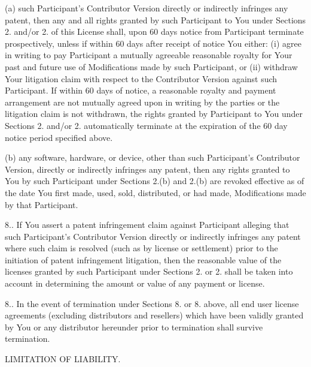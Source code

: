 \begin{DoxyEnumerate}
(a) such Participant's Contributor Version directly or indirectly infringes any patent, then any and all rights granted by such Participant to You under Sections 2. and/or 2. of this License shall, upon 60 days notice from Participant terminate prospectively, unless if within 60 days after receipt of notice You either\-: (i) agree in writing to pay Participant a mutually agreeable reasonable royalty for Your past and future use of Modifications made by such Participant, or (ii) withdraw Your litigation claim with respect to the Contributor Version against such Participant. If within 60 days of notice, a reasonable royalty and payment arrangement are not mutually agreed upon in writing by the parties or the litigation claim is not withdrawn, the rights granted by Participant to You under Sections 2. and/or 2. automatically terminate at the expiration of the 60 day notice period specified above.

(b) any software, hardware, or device, other than such Participant's Contributor Version, directly or indirectly infringes any patent, then any rights granted to You by such Participant under Sections 2.(b) and 2.(b) are revoked effective as of the date You first made, used, sold, distributed, or had made, Modifications made by that Participant.

8.. If You assert a patent infringement claim against Participant alleging that such Participant's Contributor Version directly or indirectly infringes any patent where such claim is resolved (such as by license or settlement) prior to the initiation of patent infringement litigation, then the reasonable value of the licenses granted by such Participant under Sections 2. or 2. shall be taken into account in determining the amount or value of any payment or license.

8.. In the event of termination under Sections 8. or 8. above, all end user license agreements (excluding distributors and resellers) which have been validly granted by You or any distributor hereunder prior to termination shall survive termination.
\item L\-I\-M\-I\-T\-A\-T\-I\-O\-N O\-F L\-I\-A\-B\-I\-L\-I\-T\-Y.


\end{DoxyEnumerate}
